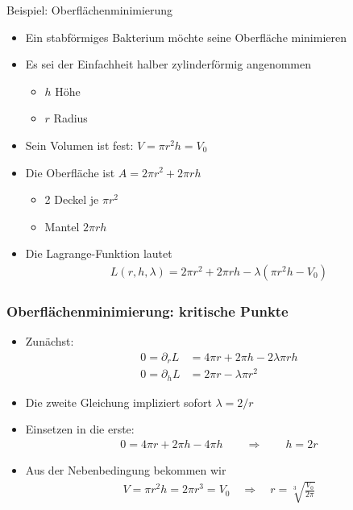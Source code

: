 \begin{frame}{Beispiel: Oberflächenminimierung}
  \begin{itemize}
  \item Ein stabförmiges Bakterium möchte seine Oberfläche minimieren
  \item Es sei der Einfachheit halber zylinderförmig angenommen
    \begin{itemize}
    \item $h$ Höhe
    \item $r$ Radius
    \end{itemize}
  \item Sein Volumen ist fest: $V = \pi r^2h = V_0$
  \item Die Oberfläche ist $A=2\pi r^2+2\pi r h$
    \begin{itemize}
    \item 2 Deckel je $\pi r^2$
    \item Mantel $2\pi r h$
    \end{itemize}
  \item Die Lagrange-Funktion lautet
    \begin{gather*}
      L(r,h,\lambda) = 2\pi r^2+2\pi r h - \lambda(\pi r^2h - V_0)
    \end{gather*}
  \end{itemize}
\end{frame}

\begin{frame}
  \frametitle<presentation>{Oberflächenminimierung: kritische Punkte}
  \begin{itemize}
  \item Zunächst:
    \begin{align*}
      0=\partial_r L &= 4\pi r + 2\pi h - 2\lambda \pi rh\\
      0=\partial_h L &= 2\pi r - \lambda \pi r^2
    \end{align*}
  \item Die zweite Gleichung impliziert sofort $\lambda = 2/r$
    \pause
  \item Einsetzen in die erste:
    \begin{gather*}
      0=4\pi r+ 2\pi h - 4 \pi h
      \qquad\Rightarrow\qquad h=2r
    \end{gather*}
  \item Aus der Nebenbedingung bekommen wir
    \begin{gather*}
      V = \pi r^2 h = 2\pi r^3 = V_0
      \quad\Rightarrow\quad r = \sqrt[3]{\frac{V_0}{2\pi}}
    \end{gather*}
  \end{itemize}
\end{frame}


